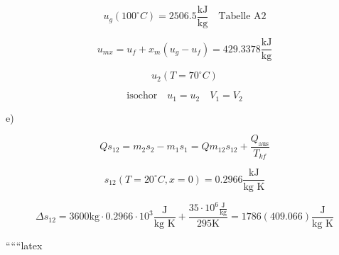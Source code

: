 \[
u_g (100^\circ C) = 2506.5 \frac{\text{kJ}}{\text{kg}} \quad \text{Tabelle A2}
\]

\[
u_{m x} = u_f + x_m (u_g - u_f) = 429.3378 \frac{\text{kJ}}{\text{kg}}
\]

\[
u_2 (T = 70^\circ C)
\]

\[
\text{isochor} \quad u_1 = u_2 \quad V_1 = V_2
\]

e)

\[
Q s_{12} = m_2 s_2 - m_1 s_1 = Q m_{12} s_{12} + \frac{Q_{\text{aus}}}{T_{kf}}
\]

\[
s_{12} (T = 20^\circ C, x = 0) = 0.2966 \frac{\text{kJ}}{\text{kg K}}
\]

\[
\Delta s_{12} = 3600 \text{kg} \cdot 0.2966 \cdot 10^3 \frac{\text{J}}{\text{kg K}} + \frac{35 \cdot 10^6 \frac{\text{J}}{\text{kg}}}{295 \text{K}} = 1786 (409.066) \frac{\text{J}}{\text{kg K}}
\]

``````latex


